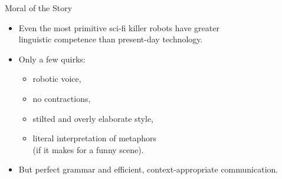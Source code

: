 \documentclass[xcolor={usenames,svgnames,x11names,dvipsnames,table}]{beamer}
\begin{document}
\begin{frame}{Moral of the Story}
    \begin{itemize}
        \item Even the most primitive sci-fi killer robots have greater\\
            linguistic competence than present-day technology.
        \item Only a few quirks:
            \begin{itemize}
                \item robotic voice,
                \item no contractions,
                \item stilted and overly elaborate style,
                \item literal interpretation of metaphors\\
                    (if it makes for a funny scene).
            \end{itemize}
        \item But perfect grammar and efficient, context-appropriate communication.
    \end{itemize}
\end{frame}
\end{document}
